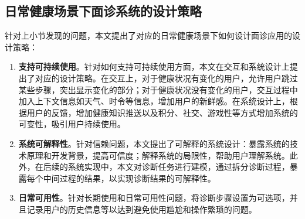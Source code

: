 \subsection{日常健康场景下面诊系统的设计策略}

针对上小节发现的问题，本文提出了对应的日常健康场景下如何设计面诊应用的设计策略：
\begin{enumerate}
    \item \textbf{支持可持续使用}。针对如何支持可持续使用方面，本文在交互和系统设计上提出了对应的设计策略。在交互上，对于健康状况有变化的用户，允许用户跳过某些步骤，突出显示变化的部分；对于健康状况没有变化的用户，交互过程中加入上下文信息如天气、时令等信息，增加用户的新鲜感。在系统设计上，根据用户的反馈，增加健康知识推送以及积分、社交、游戏性等方式增加系统的可变性，吸引用户持续使用。

    \item \textbf{系统可解释性}。针对信赖问题，本文提出了可解释的系统设计：暴露系统的技术原理和开发背景，提高可信度；解释系统的局限性，帮助用户理解系统。此外，在后续的系统实现中，本文对诊断任务进行建模，通过拆分诊断过程，暴露每个中间过程的结果，以实现诊断结果的可解释性。

    \item \textbf{日常可用性}。针对长期使用和日常可用性问题，将诊断步骤设置为可选项，并且记录用户的历史信息等以达到避免使用尴尬和操作繁琐的问题。
\end{enumerate}



